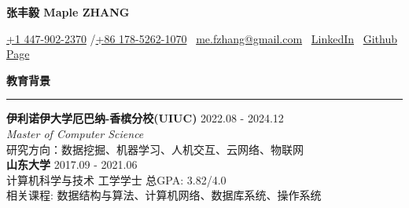 \documentclass[10pt,a4paper]{article}
\begin{document}
\pagestyle{empty} %

\begin{center}
{\Large \textbf{张丰毅 Maple ZHANG}}\\
\vspace{0.5em}

\href{tel:14479022370}{+1 447-902-2370} /\href{tel:8617852621070}{+86 178-5262-1070} \textbar\ \href{mailto:me.fzhang@gmail.com}{me.fzhang@gmail.com} \textbar\
\href{https://linkedin.com/in/fengyizhang-profile}{LinkedIn}  \textbar\
\href{https://onemapl3.github.io}{Github Page}
\end{center}

\vspace{0em}

\noindent\textbf{教育背景}\\[-0.2em]
\rule{\textwidth}{1pt}
\textbf{伊利诺伊大学厄巴纳-香槟分校(UIUC)} \hfill 2022.08 - 2024.12 \\
\textit{Master of Computer Science}\\
研究方向：数据挖掘、机器学习、人机交互、云网络、物联网\\
\textbf{山东大学} \hfill 2017.09 - 2021.06\\
计算机科学与技术 工学学士  总GPA: 3.82/4.0\\
相关课程: 数据结构与算法、计算机网络、数据库系统、操作系统
\end{document}
